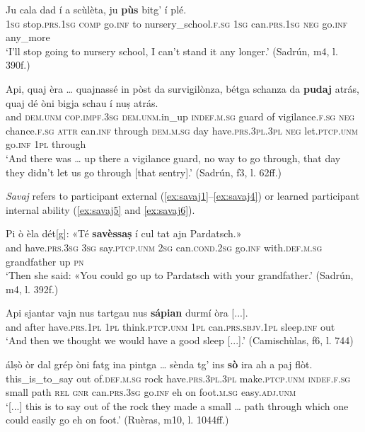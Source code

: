 \ea
\label{ex:pudaj3}
\gll  Ju cala dad í a scùlèta, ju \textbf{pùs} bitg' í plé.\\
\textsc{1sg} stop.\textsc{prs.1sg} \textsc{comp} go.\textsc{inf} to nursery\_school.\textsc{f.sg} \textsc{1sg} can.\textsc{prs.1sg} \textsc{neg} go.\textsc{inf} any\_more  \\
\glt `I’ll stop going to nursery school, I can’t stand it any longer.' (Sadrún, m4, l. 390f.)
\z

\ea
\label{ex:pudaj4}
\gll  Api, quaj èra … quajnassé in pòst da survigilònza, bétga schanza da \textbf{pudaj} atrás, quaj dé òni bigja schau í nuṣ atrás.\\
and \textsc{dem.unm} \textsc{cop.impf.3sg} {} \textsc{dem.unm}.in\_up \textsc{indef.m.sg} guard of vigilance.\textsc{f.sg} \textsc{neg} chance.\textsc{f.sg} \textsc{attr} can.\textsc{inf} through \textsc{dem.m.sg} day have.\textsc{prs.3pl.3pl} \textsc{neg} let.\textsc{ptcp.unm} go.\textsc{inf} \textsc{1pl} through\\
\glt `And there was … up there a vigilance guard, no way to go through, that day they didn’t let us go through [that sentry].' (Sadrún, f3, l. 62ff.)
\z

\textit{Savaj} refers to participant external (\ref{ex:savaj1}--\ref{ex:savaj4}) or learned participant internal ability (\ref{ex:savaj5} and \ref{ex:savaj6}). 

\ea
\label{ex:savaj1}
\gll  Pi ò èla dét[g]: «Té \textbf{savèssaṣ} í cul tat ajn Pardatsch.»  \\
and have.\textsc{prs.3sg} \textsc{3sg} say.\textsc{ptcp.unm} \textsc{2sg} can.\textsc{cond.2sg} go.\textsc{inf} with.\textsc{def.m.sg} grandfather up \textsc{pn}  \\
\glt `Then she said: «You could go up to Pardatsch with your grandfather.' (Sadrún, m4, l. 392f.)
\z

\ea
\label{ex:savaj2}
\gll    Api sjantar vajn nus tartgau nus \textbf{sápian} durmí òra [...].\\
and after have.\textsc{prs.1pl} \textsc{1pl} think.\textsc{ptcp.unm} \textsc{1pl}  can.\textsc{prs.sbjv.1pl} sleep.\textsc{inf} out\\
\glt `And then we thought we would have a good sleep [...].' (Camischùlas, f6, l. 744)
\z

\ea
\label{ex:savaj3}
\gll  [...] álṣò òr dal grép òni fatg ina pintga …  sènda tg’ ins \textbf{sò} ira ah a paj flòt.\\
{} this\_is\_to\_say out of.\textsc{def.m.sg} rock have.\textsc{prs.3pl.3pl} make.\textsc{ptcp.unm} \textsc{indef.f.sg} small {} path \textsc{rel} \textsc{gnr} can.\textsc{prs.3sg} go.\textsc{inf} eh on foot.\textsc{m.sg} easy.\textsc{adj.unm} \\
\glt `[...] this is to say out of the rock they made a small … path through which one could easily go eh on foot.' (Ruèras, m10, l. 1044ff.)
\z

